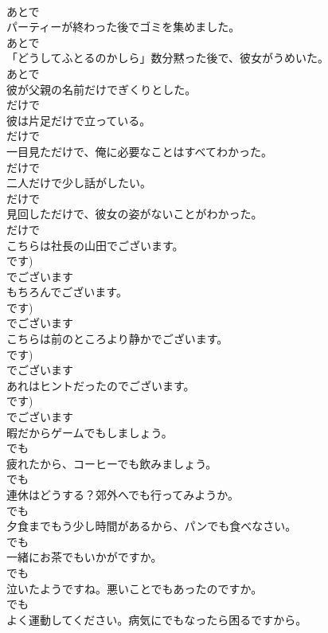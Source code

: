 \documentclass[8pt]{extreport}
\begin{document}
\begin{CJK}{UTF8}{min}
\\	あとで
\\	パーティーが終わった後でゴミを集めました。	
\\	あとで
\\	「どうしてふとるのかしら」数分黙った後で、彼女がうめいた。	
\\	あとで
\\	彼が父親の名前だけでぎくりとした。	
\\	だけで
\\	彼は片足だけで立っている。	
\\	だけで
\\	一目見ただけで、俺に必要なことはすべてわかった。	
\\	だけで
\\	二人だけで少し話がしたい。	
\\	だけで
\\	見回しただけで、彼女の姿がないことがわかった。	
\\	だけで
\\	こちらは社長の山田でございます。	
\\	です)	
\\	でございます
\\	もちろんでございます。	
\\	です)	
\\	でございます
\\	こちらは前のところより静かでございます。	
\\	です)	
\\	でございます
\\	あれはヒントだったのでございます。	
\\	です)	
\\	でございます
\\	暇だからゲームでもしましょう。	
\\	でも
\\	疲れたから、コーヒーでも飲みましょう。	
\\	でも
\\	連休はどうする？郊外へでも行ってみようか。	
\\	でも
\\	夕食までもう少し時間があるから、パンでも食べなさい。	
\\	でも
\\	一緒にお茶でもいかがですか。	
\\	でも
\\	泣いたようですね。悪いことでもあったのですか。	
\\	でも
\\	よく運動してください。病気にでもなったら困るですから。	

\end{CJK}
\end{document}
